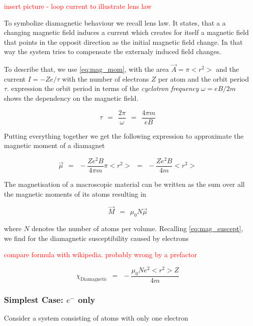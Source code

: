\documentclass[10pt]{report}
\numberwithin{equation}{chapter}
\begin{document}
\textcolor{red}{insert picture - loop current to illustrate lens law}

To symbolize diamagnetic behaviour we recall lens law. It states, that a a changing magnetic field induces a current which creates for itself a magnetic field that points in the opposit direction as the initial magnetic field change. In that way the system tries to compensate the externaly induced field changes.

To describe that, we use \ref{eq:mag_mom}, with the area $\vec{A} = \pi <r^2>$ and the current $I = -Z e/ \tau$ with the number of electrons $Z$ per atom and the orbit period $\tau$. expression the orbit period in terms of the \textit{cyclotron frequency} $\omega = eB/2m$ shows the dependency on the magnetic field.

\begin{equation}
  \tau ~~=~~ \frac{2\pi}{\omega} ~~=~~ \frac{4\pi m}{e B}
\end{equation}

Putting everything together we get the following expression to approximate the magnetic moment of a diamagnet

\begin{equation} \label{eq:mag_mom_diamag}
  \vec{\mu} ~~=~~ -\frac{Z e^2 B}{4\pi m} \pi <r^2> ~~=~~ -\frac{Ze^2B}{4m} <r^2>
\end{equation}

The magnetisation of a macroscopic material can be written as the sum over all the magnetic moments of its atoms resulting in

\begin{equation}
  \vec{M} ~~=~~ \mu_0 N \vec{\mu}
\end{equation}

where $N$ denotes the number of atoms per volume. Recalling \ref{eq:mag_suscept}, we find for the diamagnetic susceptibility caused by electrons

\textcolor{red}{compare formula with wikipedia. probably wrong by a prefactor}

\begin{equation}
  \chi_\text{Diamagnetic} ~~=~~ -\frac{\mu_0 N e^2 <r^2> Z}{4m}
\end{equation}


\subsubsection{Simplest Case: $e^-$ only}

Consider a system consisting of atoms with only one electron
\end{document}
